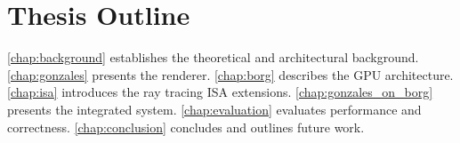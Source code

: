 \section{Thesis Outline}

\autoref{chap:background} establishes the theoretical and architectural
background.
\autoref{chap:gonzales} presents the \gonzales{} renderer.
\autoref{chap:borg} describes the \borg{} GPU architecture.
\autoref{chap:isa} introduces the ray tracing ISA extensions.
\autoref{chap:gonzales_on_borg} presents the integrated system.
\autoref{chap:evaluation} evaluates performance and correctness.
\autoref{chap:conclusion} concludes and outlines future work.
